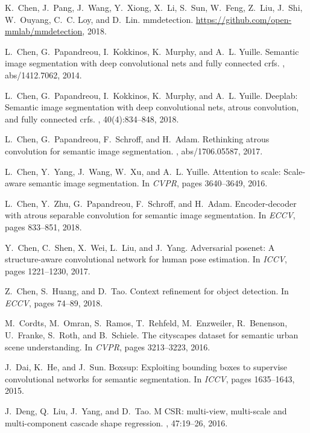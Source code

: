 \documentclass[10pt,twocolumn,letterpaper]{article}
\begin{document}
{\begin{thebibliography}{100}
K.~Chen, J.~Pang, J.~Wang, Y.~Xiong, X.~Li, S.~Sun, W.~Feng, Z.~Liu, J.~Shi,
  W.~Ouyang, C.~C. Loy, and D.~Lin.
\newblock mmdetection.
\newblock \url{https://github.com/open-mmlab/mmdetection}, 2018.

L.~Chen, G.~Papandreou, I.~Kokkinos, K.~Murphy, and A.~L. Yuille.
\newblock Semantic image segmentation with deep convolutional nets and fully
  connected crfs.
, abs/1412.7062, 2014.

L.~Chen, G.~Papandreou, I.~Kokkinos, K.~Murphy, and A.~L. Yuille.
\newblock Deeplab: Semantic image segmentation with deep convolutional nets,
  atrous convolution, and fully connected crfs.
, 40(4):834--848,
  2018.

L.~Chen, G.~Papandreou, F.~Schroff, and H.~Adam.
\newblock Rethinking atrous convolution for semantic image segmentation.
, abs/1706.05587, 2017.

L.~Chen, Y.~Yang, J.~Wang, W.~Xu, and A.~L. Yuille.
\newblock Attention to scale: Scale-aware semantic image segmentation.
\newblock In {\em {CVPR}}, pages 3640--3649, 2016.

L.~Chen, Y.~Zhu, G.~Papandreou, F.~Schroff, and H.~Adam.
\newblock Encoder-decoder with atrous separable convolution for semantic image
  segmentation.
\newblock In {\em {ECCV}}, pages 833--851, 2018.

Y.~Chen, C.~Shen, X.~Wei, L.~Liu, and J.~Yang.
\newblock Adversarial posenet: {A} structure-aware convolutional network for
  human pose estimation.
\newblock In {\em {ICCV}}, pages 1221--1230, 2017.

Z.~Chen, S.~Huang, and D.~Tao.
\newblock Context refinement for object detection.
\newblock In {\em {ECCV}}, pages 74--89, 2018.

M.~Cordts, M.~Omran, S.~Ramos, T.~Rehfeld, M.~Enzweiler, R.~Benenson,
  U.~Franke, S.~Roth, and B.~Schiele.
\newblock The cityscapes dataset for semantic urban scene understanding.
\newblock In {\em {CVPR}}, pages 3213--3223, 2016.

J.~Dai, K.~He, and J.~Sun.
\newblock Boxsup: Exploiting bounding boxes to supervise convolutional networks
  for semantic segmentation.
\newblock In {\em {ICCV}}, pages 1635--1643, 2015.

J.~Deng, Q.~Liu, J.~Yang, and D.~Tao.
\newblock M {CSR:} multi-view, multi-scale and multi-component
  cascade shape regression.
, 47:19--26, 2016.


\end{thebibliography}}
\end{document}
